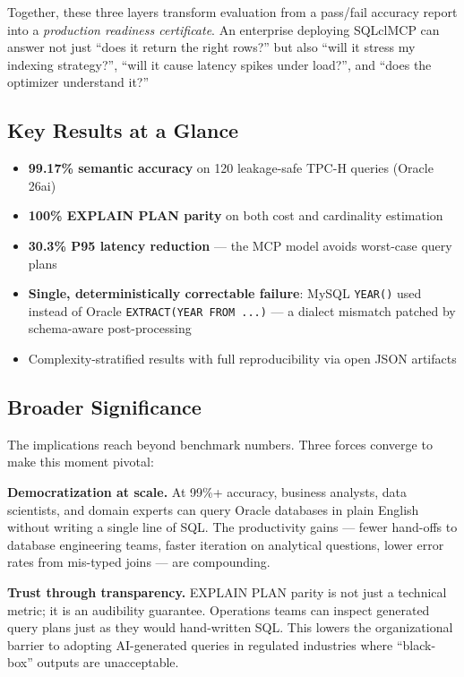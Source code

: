 Together, these three layers transform evaluation from a pass/fail accuracy report into a \emph{production readiness certificate}. An enterprise deploying SQLclMCP can answer not just ``does it return the right rows?'' but also ``will it stress my indexing strategy?'', ``will it cause latency spikes under load?'', and ``does the optimizer understand it?''

\subsection{Key Results at a Glance}

\begin{itemize}
    \item \textbf{99.17\% semantic accuracy} on 120 leakage-safe TPC-H queries (Oracle 26ai)
    \item \textbf{100\% EXPLAIN PLAN parity} on both cost and cardinality estimation
    \item \textbf{30.3\% P95 latency reduction} — the MCP model avoids worst-case query plans
    \item \textbf{Single, deterministically correctable failure}: MySQL \texttt{YEAR()} used instead of Oracle \texttt{EXTRACT(YEAR FROM ...)} — a dialect mismatch patched by schema-aware post-processing
    \item Complexity-stratified results with full reproducibility via open JSON artifacts
\end{itemize}

\subsection{Broader Significance}

The implications reach beyond benchmark numbers. Three forces converge to make this moment pivotal:

\textbf{Democratization at scale.} At 99\%+ accuracy, business analysts, data scientists, and domain experts can query Oracle databases in plain English without writing a single line of SQL. The productivity gains — fewer hand-offs to database engineering teams, faster iteration on analytical questions, lower error rates from mis-typed joins — are compounding.

\textbf{Trust through transparency.} EXPLAIN PLAN parity is not just a technical metric; it is an audibility guarantee. Operations teams can inspect generated query plans just as they would hand-written SQL. This lowers the organizational barrier to adopting AI-generated queries in regulated industries where ``black-box'' outputs are unacceptable.

